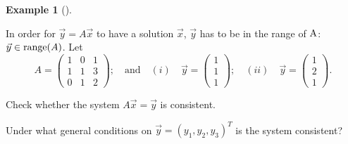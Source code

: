 \documentclass[
  a4paper,
  DIV=11,
  numbers=noendperiod,
  oneside]{scrreprt}
\theoremstyle{definition}
\newtheorem{example}{Example}[chapter]
\theoremstyle{remark}
\begin{document}
\begin{example}[]\protect\hypertarget{exm-}{}\label{exm-}

In order for \(\vec{y}=A \vec{x}\) to have a solution \(\vec{x}\),
\(\vec{y}\) has to be in the range of \({\rm A}\):
\(\vec{y} \in {\rm range}(A)\). Let \[A = \left(\begin{array}{ccc}
            1 & 0 & 1 \\
            1 & 1 & 3 \\
            0 & 1 & 2
        \end{array}\right); \quad \text{and} \quad (i) \quad  \vec{y} = \begin{pmatrix} 1 \\ 1 \\ 1  \end{pmatrix}; \quad  (ii) \quad \vec{y}= \begin{pmatrix} 1 \\ 2 \\ 1  \end{pmatrix}. \]

Check whether the system \(A\vec{x}=\vec{y}\) is consistent.

Under what general conditions on
\(\vec{y} = \left(y_1,y_2, y_3\right)^T\) is the system consistent?


\end{example}
\end{document}

